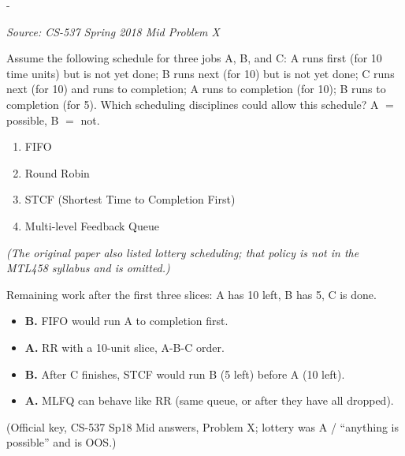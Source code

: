 \documentclass[11pt,a4paper]{article}
\makeatletter
\newcommand{\keepspace}[1]{\par\penalty-100\begingroup
  \setlength{\dimen@}{#1}\dimen@ii\pagegoal\advance\dimen@ii-\pagetotal
  \ifdim\dimen@>\dimen@ii\ifdim\dimen@ii>\z@\vfil\fi\break\fi\endgroup}
\newcounter{qn}[section]
\newenvironment{Qn}[4]{%
  \refstepcounter{qn}\keepspace{7\baselineskip}%
  \begin{tcolorbox}[qboxstyle, title={Q\thesection.\theqn\ \ [#1 \textbar\ #2]\ \ #4}]%
  {\footnotesize\color{g3}\textit{Source: #3}}\par\smallskip%
}{%
  \end{tcolorbox}%
}
\newenvironment{Sol}{%
  \begin{tcolorbox}[sboxstyle, title={Solution}]%
}{%
  \end{tcolorbox}\vspace{0.35em}%
}
\makeatother
\begin{document}
\begin{Qn}{Easy-Medium}{Lect 5--7}{CS-537 Spring 2018 Mid Problem X}{Which discipline could produce this schedule?}
Assume the following schedule for three jobs A, B, and C:
A runs first (for 10 time units) but is not yet done;
B runs next (for 10) but is not yet done;
C runs next (for 10) and runs to completion;
A runs to completion (for 10);
B runs to completion (for 5).
Which scheduling disciplines could allow this schedule? A $=$ possible, B $=$ not.
\begin{enumerate}
  \item[46.] FIFO
  \item[47.] Round Robin
  \item[48.] STCF (Shortest Time to Completion First)
  \item[49.] Multi-level Feedback Queue
\end{enumerate}
\textit{(The original paper also listed lottery scheduling; that policy is not in the MTL458 syllabus and is omitted.)}
\end{Qn}
\begin{Sol}
Remaining work after the first three slices: A has 10 left, B has 5, C is done.
\begin{itemize}
  \item[46.] \textbf{B.} FIFO would run A to completion first.
  \item[47.] \textbf{A.} RR with a 10-unit slice, A-B-C order.
  \item[48.] \textbf{B.} After C finishes, STCF would run B (5 left) before A (10 left).
  \item[49.] \textbf{A.} MLFQ can behave like RR (same queue, or after they have all dropped).
\end{itemize}
(Official key, CS-537 Sp18 Mid answers, Problem X; lottery was A / ``anything is possible'' and is OOS.)
\end{Sol}
\end{document}
